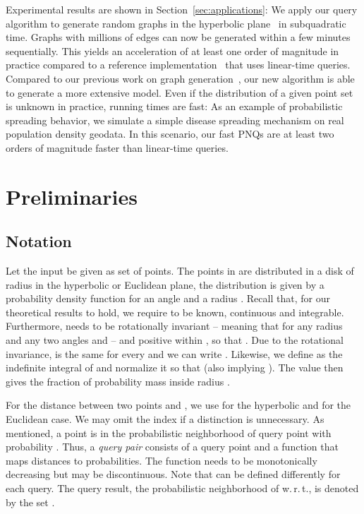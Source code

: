 \documentclass{llncs}
\newcommand{\wrt}{w.\,r.\,t.\xspace}
\begin{document}
Experimental results are shown in Section~\ref{sec:applications}: We apply our query algorithm to generate random graphs
in the hyperbolic plane~\cite{Krioukov2010} in subquadratic time. Graphs with millions of edges can now be generated 
within a few minutes sequentially.
This yields an acceleration of at least one order of magnitude in practice compared to a reference implementation~\cite{Aldecoa2015} that uses linear-time queries. Compared to our previous work on graph generation~\cite{Looz2015HRG}, 
our new algorithm is able to generate a more extensive model.
Even if the distribution of a given point set  is unknown in practice, running times are fast:
As an example of probabilistic spreading behavior, we simulate a simple disease spreading mechanism on real population density geodata.
In this scenario, our fast PNQs are at least two orders of magnitude faster than linear-time queries.

\section{Preliminaries}
\label{sec:prelim}

\subsection{Notation}
\label{sub:notation}
\newcommand{\hyperbolic}{\ensuremath{\mathbb{H}}}
\newcommand{\Euclidean}{\ensuremath{\mathbb{E}}}
Let the input be given as set  of  points. 
The points in  are distributed in a disk  of radius  in the hyperbolic or Euclidean plane, the distribution is given by a probability density function  for an angle  and a radius .
Recall that, for our theoretical results to hold, we require  to be known, continuous and integrable.
Furthermore,  needs to be rotationally invariant -- meaning that  for any radius  and any two angles  and  -- and positive within  ,
so that .
Due to the rotational invariance,  is the same for every  and we can write .
Likewise, we define  as the indefinite integral of  and normalize it so that  (also implying ). The value  then gives the fraction of probability mass inside radius .

For the distance between two points  and , we use  for the hyperbolic and  for the Euclidean case.
We may omit the index if a distinction is unnecessary.
As mentioned, a point  is in the probabilistic neighborhood of query point  with probability .
Thus, a \emph{query pair} consists of a query point  and a function  that maps distances to probabilities.
The function  needs to be monotonically decreasing but may be discontinuous. Note that  can be 
defined differently for each query.
The query result, the probabilistic neighborhood of  \wrt , is denoted by the set .
\end{document}
